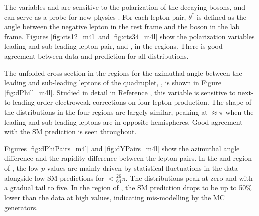 The variables \CTSOneTwo{} and \CTSThreeFour{} are sensitive to the polarization of the decaying bosons, and can serve as a probe for new physics \cite{Denner_2020}. For each lepton pair, $\theta^*$ is defined as the angle between the negative lepton in the \Z rest frame and the \Z boson in the lab frame. Figures \ref{fig:cts12_m4l} and \ref{fig:cts34_m4l} show the polarization variables leading and sub-leading lepton pair, \CTSOneTwo{} and \CTSThreeFour{}, in the \mFourL{} regions. There is good agreement between data and prediction for all distributions. 

The unfolded cross-section in the \mFourL{} regions for the azimuthal angle between the leading and sub-leading leptons of the quadruplet, \dPhill{}, is shown in Figure \ref{fig:dPhill_m4l}. Studied in detail in Reference \cite{Gutschow_2021}, this variable is sensitive to next-to-leading order electroweak corrections on four lepton production. The shape of the distributions in the four regions are largely similar, peaking at \dPhill{}$\approx\pi$ when the leading and sub-leading leptons are in opposite hemispheres. Good agreement with the SM prediction is seen throughout.

Figures \ref{fig:dPhiPairs_m4l} and \ref{fig:dYPairs_m4l} show the azimuthal angle difference and the rapidity difference between the lepton pairs. In the \offshellZZ{} and \onshellZZ{} region of \dPhiPairs{}, the low $p$-values are mainly driven by statistical fluctuations in the data alongside low SM predictions for \dPhiPairs{}$<\frac{26}{64}\pi$. The \dYPairs{} distributions peak at zero and with a gradual tail to five. In the \onshellZZ{} region of \dYPairs{}, the SM prediction drops to be up to 50\% lower than the data at high values, indicating mis-modelling by the MC generators. 

